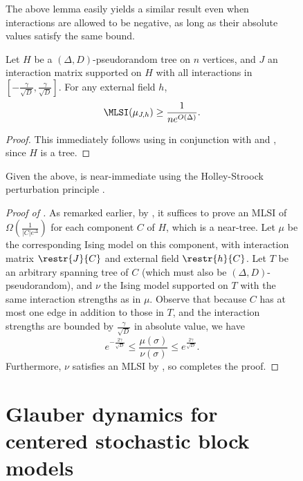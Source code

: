\documentclass[11pt,letterpaper]{article}
\begin{document}
\begin{figure}
    The above lemma easily yields a similar result even when interactions are allowed to be negative, as long as their absolute values satisfy the same bound.

    \begin{corollary}
        \label{lem:pseudorandom-nonferro-mixing}
         Let $H$ be a $(\Delta,D)$-pseudorandom tree on $n$ vertices, and $J$ an interaction matrix supported on $H$ with all interactions in $\left[- \frac{\gamma}{\sqrt{D}}, \frac{\gamma}{\sqrt{D}}\right]$.
        For any external field $h$, 
        \[ \MLSI(\mu_{J,h}) \ge \frac{1}{ne^{O(\Delta)}}. \]
    \end{corollary}
    \begin{proof}
        This immediately follows using  in conjunction with  and , since $H$ is a tree.
    \end{proof}

    Given the above,  is near-immediate using the Holley-Stroock perturbation principle .

    \begin{proof}[Proof of ]
        As remarked earlier, by , it suffices to prove an MLSI of $\Omega\left(\frac{1}{|C|e^{\Delta}}\right)$ for each component $C$ of $H$, which is a near-tree. Let $\mu$ be the corresponding Ising model on this component, with interaction matrix $\restr{J}{C}$ and external field $\restr{h}{C}$. Let $T$ be an arbitrary spanning tree of $C$ (which must also be $(\Delta,D)$-pseudorandom), and $\nu$ the Ising model supported on $T$ with the same interaction strengths as in $\mu$. Observe that because $C$ has at most one edge in addition to those in $T$, and the interaction strengths are bounded by $\frac{\gamma}{\sqrt{D}}$ in absolute value, we have
        \[ e^{-\frac{2\gamma}{\sqrt{D}}} \le \frac{\mu(\sigma)}{\nu(\sigma)} \le e^{\frac{2\gamma}{\sqrt{D}}}. \]
        Furthermore, $\nu$ satisfies an MLSI by , so  completes the proof.
    \end{proof}%

% 


\section{Glauber dynamics for centered stochastic block models}\label{sec:sbm-results}


\end{figure}
\end{document}
